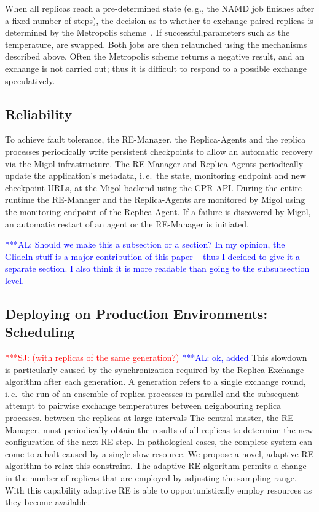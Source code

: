 \documentclass{rspublic}
\newcommand{\alnote}[1]{ {\textcolor{blue} { ***AL: #1 }}}
\newcommand{\jhanote}[1]{ {\textcolor{red} { ***SJ: #1 }}}
\newcommand{\alnote}[1]{}
\newcommand{\jhanote}[1]{}
\newcommand{\remanager}[1]{RE-Manager }
\begin{document}
When all replicas reach a pre-determined state (e.\,g., the NAMD job finishes 
after a fixed number of steps), the decision as to whether to exchange
paired-replicas is determined by the Metropolis scheme~\cite{metropolis:1087}. 
If successful,parameters such as the temperature, are swapped. Both jobs are then
relaunched using the mechanisms described above. Often the Metropolis
scheme returns a negative result, and an exchange is not carried out;
thus it is difficult to respond to a possible exchange speculatively. 


\subsection{Reliability}
To achieve fault tolerance, the RE-Manager, the Replica-Agents and the
replica processes periodically write persistent checkpoints to allow
an automatic recovery via the Migol infrastructure. The \remanager\
and Replica-Agents periodically update the application's metadata,
i.\,e.\ the state, monitoring endpoint and new checkpoint URLs, at the
Migol backend using the CPR API. During the entire runtime the
\remanager\ and the Replica-Agents are monitored by Migol using the
monitoring endpoint of the Replica-Agent. If a failure is discovered
by Migol, an automatic restart of an agent or the RE-Manager is
initiated.

\alnote{Should we make this a subsection or a section? In my opinion,
the GlideIn stuff is a major contribution of this paper -- thus I decided to
give it a separate section. I also think it is more readable than going to the
subsubsection level.}           

\subsection{Deploying on Production Environments: Scheduling}
\jhanote{(with replicas of the same generation?)} \alnote{ok, added}
This slowdown is particularly caused by the synchronization required
by the Replica-Exchange algorithm after each generation.  A generation
refers to a single exchange round, i.\,e.\ the run of an ensemble of
replica processes in parallel and the subsequent attempt to pairwise
exchange temperatures between neighbouring replica processes.  between
the replicas at large intervals The central master, the RE-Manager,
must periodically obtain the results of all replicas to determine the
new configuration of the next RE step.  In pathological cases, the
complete system can come to a halt caused by a single slow
resource. We propose a novel, adaptive RE algorithm to relax this
constraint. The adaptive RE algorithm permits a change in the number
of replicas that are employed by adjusting the sampling range.  With
this capability adaptive RE is able to opportunistically employ
resources as they become available.
\end{document}
